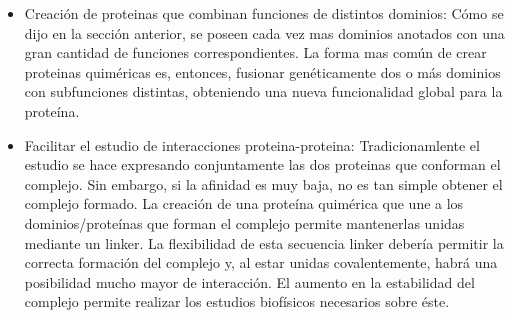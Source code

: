 \begin{itemize}
 \item Creación de proteinas que combinan funciones de distintos dominios:
Cómo se dijo en la sección anterior, se poseen cada vez mas dominios anotados con una gran cantidad de funciones correspondientes.
La forma mas común de crear proteinas quiméricas es, entonces, fusionar genéticamente dos o más dominios con subfunciones distintas, obteniendo una nueva funcionalidad global para la proteína.
\item Facilitar el estudio de interacciones proteina-proteina\cite{reddy2013linkers}: 
Tradicionamlente el estudio se hace expresando conjuntamente las dos proteinas que conforman el complejo.
Sin embargo, si la afinidad es muy baja, no es tan simple obtener el complejo formado.
La creación de una proteína quimérica que une a los dominios/proteínas que forman el complejo permite mantenerlas unidas mediante un linker.
La flexibilidad de esta secuencia linker debería permitir la correcta formación del complejo y, al estar unidas covalentemente, habrá una posibilidad mucho mayor de interacción.
El aumento en la estabilidad del complejo permite realizar los estudios biofísicos necesarios sobre éste.

\end{itemize}
